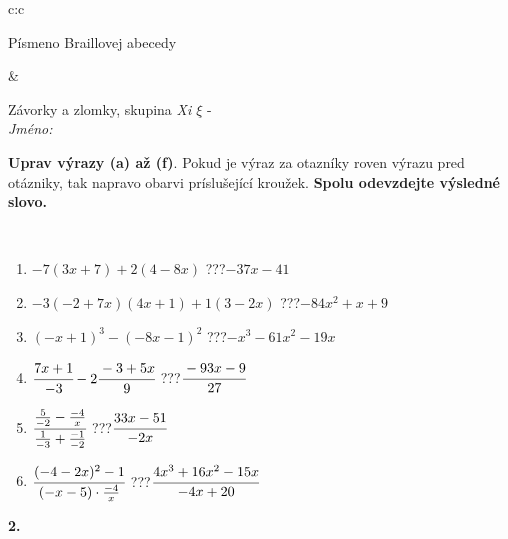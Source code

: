 \documentclass[10pt]{report}
\begin{document}
\begin{tabular}{c:c}
\begin{minipage}[c][104.5mm][t]{0.5\linewidth}
\begin{center}
\begin{minipage}{0.20\linewidth}
\begin{center}
{\small Písmeno Braillovej abecedy}
\end{center}
\end{minipage}
\end{center}
\end{minipage}
&
\begin{minipage}[c][104.5mm][t]{0.5\linewidth}
\begin{center}
\vspace{7mm}
{\huge Závorky a zlomky, skupina \textit{Xi $\xi$} -}\\[5mm]
\textit{Jméno:}\phantom{xxxxxxxxxxxxxxxxxxxxxxxxxxxxxxxxxxxxxxxxxxxxxxxxxxxxxxxxxxxxxxxxx}\\[5mm]
\begin{minipage}{0.95\linewidth}
\begin{center}
\textbf{Uprav výrazy (a) až (f)}. Pokud je výraz za otazníky roven výrazu pred otázniky, tak napravo obarvi príslušející kroužek. \textbf{Spolu odevzdejte výsledné slovo.}
\end{center}
\end{minipage}
\\[1mm]
\begin{minipage}{0.79\linewidth}
\begin{center}
\begin{varwidth}{\linewidth}
\begin{enumerate}
\normalsize
\item $-7(3x+7)+2(4-8x)$\quad \dotfill\; ???\;\dotfill \quad $-37x-41$
\item $-3(-2+7x)(4x+1)+1(3-2x)$\quad \dotfill\; ???\;\dotfill \quad $-84x^2+x+9$
\item $(-x+1)^3-(-8x-1)^2$\quad \dotfill\; ???\;\dotfill \quad $-x^3-61x^2-19x$
\item $\cfrac{7x+1}{-3}-2\cfrac{-3+5x}{9}$\quad \dotfill\; ???\;\dotfill \quad $\cfrac{-93x-9}{27}$
\item $\cfrac{\frac{5}{-2}-\frac{-4}{x}}{\frac{1}{-3}+\frac{-1}{-2}}$\quad \dotfill\; ???\;\dotfill \quad $\cfrac{33x-51}{-2x}$
\item $\cfrac{(-4-2x)^2-1}{(-x-5)\cdot\frac{-4}{x}}$\quad \dotfill\; ???\;\dotfill \quad $\cfrac{4x^3+16x^2-15x}{-4x+20}$
\end{enumerate}
\end{varwidth}
\end{center}
\end{minipage}
\begin{minipage}{0.20\linewidth}
\begin{center}
{\Huge\bfseries 2.} \\[2mm]

\end{center}
\end{minipage}
\end{center}
\end{minipage}
\end{tabular}
\end{document}
